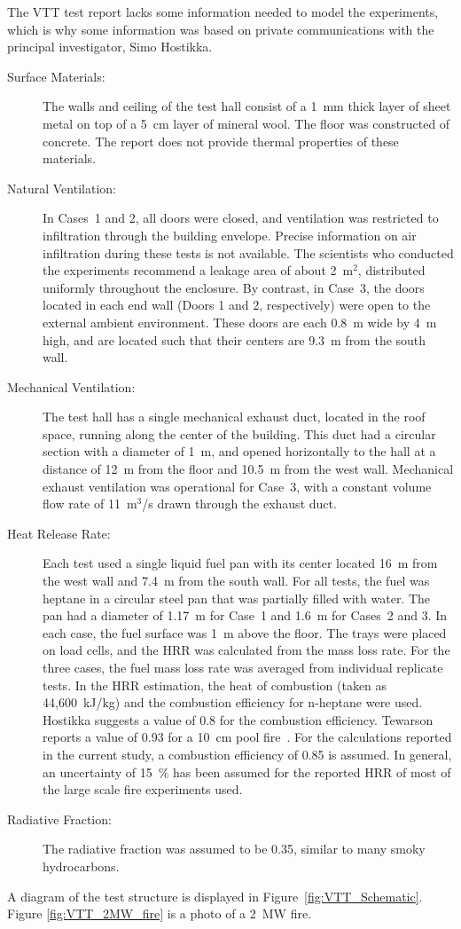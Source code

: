 The VTT test report lacks some information needed to model the experiments, which is why some information was based on private communications with the
principal investigator, Simo Hostikka.
\begin{description}
\item[Surface Materials:] The walls and ceiling of the test hall consist of a 1~mm thick layer of sheet metal on top of a 5~cm layer of mineral wool. The floor was constructed of concrete. The report does not provide thermal properties of these materials.
\item[Natural Ventilation:] In Cases~1 and 2, all doors were closed, and ventilation was restricted to infiltration through the building envelope. Precise information on air infiltration during these tests is not available. The scientists who conducted the experiments recommend a leakage area of about 2~m$^2$, distributed uniformly throughout the enclosure. By contrast, in Case~3, the doors located in each end wall (Doors 1 and 2, respectively) were open to the external ambient environment. These doors are each 0.8~m wide by 4~m high, and are located such that their centers are 9.3~m from the south wall.
\item[Mechanical Ventilation:] The test hall has a single mechanical exhaust duct, located in the roof space, running along the center of the building. This duct had a circular section with a diameter of 1~m, and opened horizontally to the hall at a distance of 12~m from the floor and 10.5~m from the west wall. Mechanical exhaust ventilation was operational for Case~3, with a constant volume flow rate of 11~m$^3$/s drawn through the exhaust duct.
\item[Heat Release Rate:] Each test used a single liquid fuel pan with its center located 16~m from the west wall and 7.4~m from the south wall. For all tests, the fuel was heptane in a circular steel pan that was partially filled with water. The pan had a diameter of 1.17~m for Case~1 and 1.6~m for Cases~2 and 3. In each case, the fuel surface was 1~m above the floor. The trays were placed on load cells, and the HRR was calculated from the mass loss rate. For the three cases, the fuel mass loss rate was averaged from individual replicate tests. In the HRR estimation, the heat of combustion (taken as 44,600~kJ/kg) and the combustion efficiency for n-heptane were used. Hostikka suggests a value of 0.8 for the combustion efficiency. Tewarson reports a value of 0.93 for a 10~cm pool fire~\cite{Tewarson:2003}. For the calculations reported in the current study, a combustion efficiency of 0.85 is assumed. In general, an uncertainty of 15~\% has been assumed for the reported HRR of most of the large scale fire experiments used.
\item[Radiative Fraction:] The radiative fraction was assumed to be 0.35, similar to many smoky hydrocarbons.
\end{description}
A diagram of the test structure is displayed in Figure~\ref{fig:VTT_Schematic}. Figure \ref{fig:VTT_2MW_fire} is a photo of a 2~MW fire.

